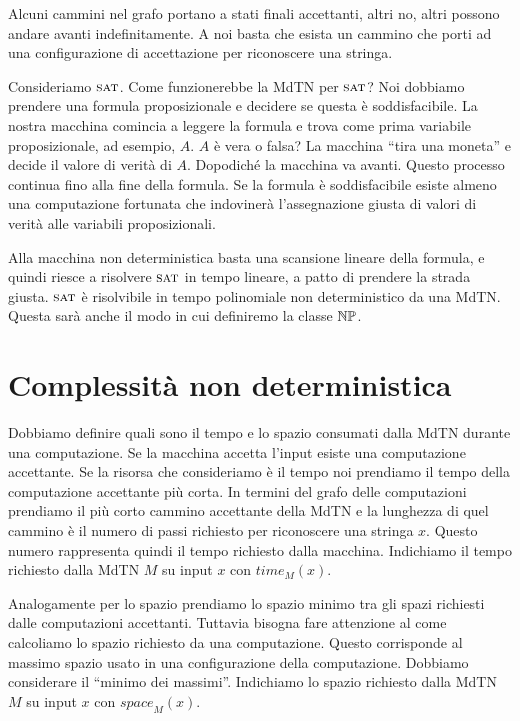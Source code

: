 Alcuni cammini nel grafo portano a stati finali accettanti, altri no, altri possono andare avanti
indefinitamente. A noi basta che esista un cammino che porti ad una configurazione di accettazione
per riconoscere una stringa.


Consideriamo $\textsc{sat}$. Come funzionerebbe la MdTN per $\textsc{sat}$? Noi dobbiamo prendere una formula
proposizionale e decidere se questa è soddisfacibile. La nostra macchina comincia a leggere la
formula e trova come prima variabile proposizionale, ad esempio, $A$. $A$ è vera o falsa? La
macchina ``tira una moneta'' e decide il valore di verità di $A$. Dopodiché la macchina va avanti.
Questo processo continua fino alla fine della formula. Se la formula è soddisfacibile esiste almeno
una computazione fortunata che indovinerà l'assegnazione giusta di valori di verità alle variabili
proposizionali.

Alla macchina non deterministica basta una scansione lineare della formula, e quindi riesce a
risolvere $\textsc{sat}$ in tempo lineare, a patto di prendere la strada giusta. $\textsc{sat}$ è risolvibile in
tempo polinomiale non deterministico da una MdTN. Questa sarà anche il modo in cui definiremo la
classe $\mathbb{NP}$.

\section{Complessità non deterministica}

Dobbiamo definire quali sono il tempo e lo spazio consumati dalla MdTN durante una computazione. Se
la macchina accetta l'input esiste una computazione accettante. Se la risorsa che consideriamo è il
tempo noi prendiamo il tempo della computazione accettante più corta. In termini del grafo delle
computazioni prendiamo il più corto cammino accettante della MdTN e la lunghezza di quel cammino è
il numero di passi richiesto per riconoscere una stringa $x$. Questo numero rappresenta quindi il
tempo richiesto dalla macchina. Indichiamo il tempo richiesto dalla MdTN $M$ su input $x$ con
$\textit{time}_{M}(x)$.

Analogamente per lo spazio prendiamo lo spazio minimo tra gli spazi richiesti dalle computazioni
accettanti. Tuttavia bisogna fare attenzione al come calcoliamo lo spazio richiesto da una
computazione. Questo corrisponde al massimo spazio usato in una configurazione della computazione.
Dobbiamo considerare il ``minimo dei massimi''. Indichiamo lo spazio richiesto dalla MdTN $M$ su
input $x$ con $\textit{space}_{M}(x)$.

